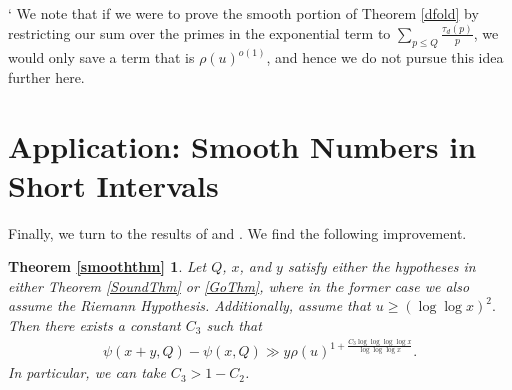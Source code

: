 \documentclass{amsart}
\newtheorem{theorem}{Theorem}[section]
\newtheorem*{vtsmooththm}{Theorem {\ref{smooththm}}}
\begin{document}
`%
We note that if we were to prove the smooth portion of Theorem \ref{dfold} by restricting our sum over the primes in the exponential term to $\sum_{p\leq Q}\frac{\tau_d(p)}p$, we would only save a term that is $\rho(u)^{o(1)}$, and hence we do not pursue this idea further here.

\section{Application: Smooth Numbers in Short Intervals}
Finally, we turn to the results of \cite{So} and \cite{Go}.  We find the following improvement.


\begin{vtsmooththm}
Let $Q$, $x$, and $y$ satisfy either the hypotheses in either Theorem \ref{SoundThm} or \ref{GoThm}, where in the former case we also assume the Riemann Hypothesis.  Additionally, assume that $u\geq (\log\log x)^2.$  Then there exists a constant $C_3$ such that 
\begin{gather}
\psi(x+y,Q)-\psi(x,Q)\gg y\rho(u)^{1+\frac{C_3\log\log \log\log x}{\log\log \log x}}.
\end{gather}
In particular, we can take $C_3>1-C_2$.
\end{vtsmooththm}
\end{document}
